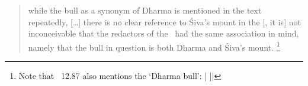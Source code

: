\begin{quote} 
while the bull as a synonym of Dharma is mentioned in 
the text repeatedly, [\dots]
there is no clear reference to Śiva's mount in the [\VSS, it is] 
not inconceivable that the redactors of the \Vss\ had 
the same association in mind, namely that the bull in 
question is both Dharma and Śi­va's mount.%
	\footnote{Note that \SDhU\  12.87
				also mentions the `Dharma bull':
	     |
    	 || }
\end{quote} 



%



%
%

